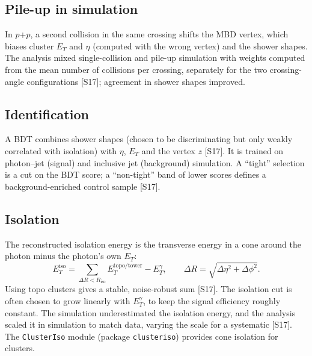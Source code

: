 \documentclass[11pt,letterpaper]{article}
\begin{document}
\subsection{Pile-up in simulation}
In $p$+$p$, a second collision in the same crossing shifts the MBD vertex, which biases cluster $E_T$ and $\eta$ (computed with the wrong vertex) and the shower shapes.
The analysis mixed single-collision and pile-up simulation with weights computed from the mean number of collisions per crossing, separately for the two crossing-angle configurations [S17]; agreement in shower shapes improved.

\subsection{Identification}
A BDT combines shower shapes (chosen to be discriminating but only weakly correlated with isolation) with $\eta$, $E_T$ and the vertex $z$ [S17].
It is trained on photon--jet (signal) and inclusive jet (background) simulation. A ``tight'' selection is a cut on the BDT score; a ``non-tight'' band of lower scores defines a background-enriched control sample [S17].

\subsection{Isolation}\label{sec:iso}
The reconstructed isolation energy is the transverse energy in a cone around the photon minus the photon's own $E_T$:
\begin{equation}
E_T^{\mathrm{iso}} = \sum_{\Delta R<R_{\mathrm{iso}}} E_T^{\mathrm{topo/tower}} - E_T^\gamma, \qquad \Delta R=\sqrt{\Delta\eta^2+\Delta\phi^2}.
\end{equation}
Using topo clusters gives a stable, noise-robust sum [S17]. The isolation cut is often chosen to grow linearly with $E_T^\gamma$, to keep the signal efficiency roughly constant.
The simulation underestimated the isolation energy, and the analysis scaled it in simulation to match data, varying the scale for a systematic [S17].
The \texttt{ClusterIso} module (package \texttt{clusteriso}) provides cone isolation for clusters.
\end{document}
